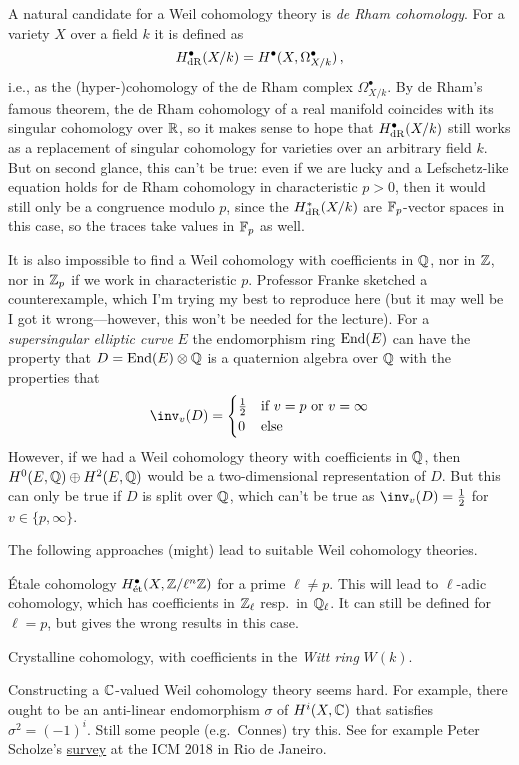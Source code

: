 \begin{cntx}
A natural candidate for a Weil cohomology theory is \emph{de Rham cohomology}. For a variety $X$ over a field $k$ it is defined as 
\begin{equation*}
	H_{\mathrm{dR}}^ \bullet(X/k)= H^ \bullet(X,\Omega_{X/k}^\bullet)\,,
\end{equation*}
i.e., as the (hyper-)cohomology of the de Rham complex $\Omega_{X/k}^\bullet$.	By de Rham's famous theorem, the de Rham cohomology of a real manifold coincides with its singular cohomology over $\mathbb{R}$, so it makes sense to hope that $H_{\mathrm{dR}}^ \bullet(X/k)$ still works as a replacement of singular cohomology for varieties over an arbitrary field $k$. But on second glance, this can't be true: even if we are lucky and a Lefschetz-like equation holds for de Rham cohomology in characteristic $p >0$, then it would still only be a congruence modulo $p$, since the $H_{\mathrm{dR}}^*(X/k)$ are $\mathbb{F}_p$-vector spaces in this case, so the traces take values in $\mathbb{F}_p$ as well.
\end{cntx}
\begin{cntx}
It is also impossible to find a Weil cohomology with coefficients in $\mathbb{Q}$, nor in $\mathbb{Z}$, nor in $\mathbb{Z}_p$ if we work in characteristic $p$. Professor Franke sketched a counterexample, which I'm trying my best to reproduce here (but it may well be I got it wrong---however, this won't be needed for the lecture). For a \emph{supersingular elliptic curve} $E$ the endomorphism ring $\operatorname{End}(E)$ can have the property that $D=\operatorname{End}(E)\otimes \mathbb{Q}$ is a quaternion algebra over $\mathbb{Q}$ with the properties that
\begin{align*}
	\inv_v(D)=\begin{cases}
		\frac{1}{2} & \text{if }v=p\text{ or }v=\infty\\
		0 & \text{else}
	\end{cases}
\end{align*}
However, if we had a Weil cohomology theory with coefficients in $\mathbb{Q}$, then $H^0(E,\mathbb{Q})\oplus H^2(E,\mathbb{Q})$ would be a two-dimensional representation of $D$. But this can only be true if $D$ is split over $\mathbb{Q}$, which can't be true as $\inv_v(D)=\frac12$ for $v\in\{p,\infty\}$.
\end{cntx}
 The following approaches (might) lead to suitable Weil cohomology theories.
\begin{alphanumerate}
	\item Étale cohomology $H_{\mathrm{\acute{e}t}}^\bullet(X,\mathbb{Z}/\ell^n\mathbb{Z})$ for a prime $\ell\neq p$. This will lead to $\ell$-adic cohomology, which has coefficients in $\mathbb{Z}_\ell$ resp.\ in $\mathbb{Q}_\ell$. It can still be defined for $\ell=p$, but gives the wrong results in this case.
	\item Crystalline cohomology, with coefficients in the \emph{Witt ring} $W(k)$.
	\item Constructing a $\mathbb{C}$-valued Weil cohomology theory seems hard. For example, there ought to be an anti-linear endomorphism $\sigma$ of $H^i(X,\mathbb{C})$ that satisfies $\sigma^2=(-1)^i$. Still some people (e.g.\ Connes) try this. See for example Peter Scholze's \href{http://www.math.uni-bonn.de/people/scholze/Rio.pdf}{survey} at the ICM 2018 in Rio de Janeiro.
\end{alphanumerate}
